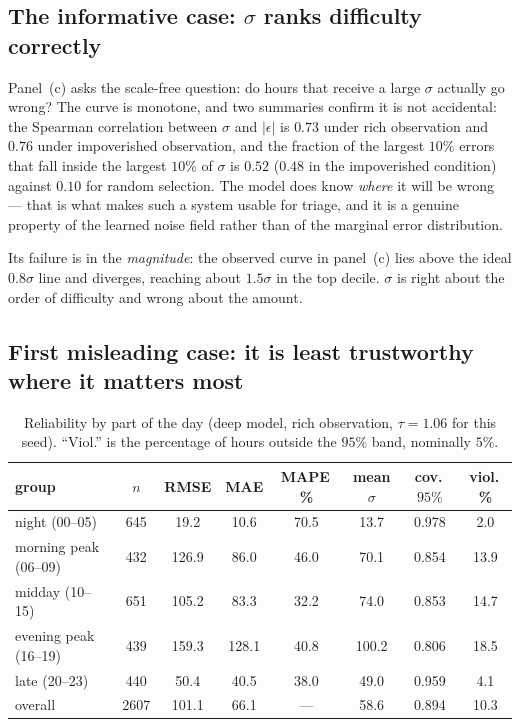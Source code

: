 \documentclass[11pt,a4paper]{article}
\begin{document}
\subsection{The informative case: $\sigma$ ranks difficulty correctly}

Panel~(c) asks the scale-free question: do hours that receive a large $\sigma$ actually go wrong? The
curve is monotone, and two summaries confirm it is not accidental: the Spearman correlation between
$\sigma$ and $|\epsilon|$ is $0.73$ under rich observation and $0.76$ under impoverished observation,
and the fraction of the largest $10\%$ errors that fall inside the largest $10\%$ of $\sigma$ is
$0.52$ ($0.48$ in the impoverished condition) against $0.10$ for random selection. The model does know
\emph{where} it will be wrong --- that is what makes such a system usable for triage, and it is a
genuine property of the learned noise field rather than of the marginal error distribution.

Its failure is in the \emph{magnitude}: the observed curve in panel~(c) lies above the ideal
$0.8\sigma$ line and diverges, reaching about $1.5\sigma$ in the top decile. $\sigma$ is right about
the order of difficulty and wrong about the amount.

\subsection{First misleading case: it is least trustworthy where it matters most}

\begin{table}[t]
\centering
\caption{Reliability by part of the day (deep model, rich observation, $\tau=1.06$ for this seed).
``Viol.'' is the percentage of hours outside the $95\%$ band, nominally $5\%$.}
\label{tab:groups}
\small
\begin{tabular}{lccccccc}
\toprule
group & $n$ & RMSE & MAE & MAPE\,\% & mean $\sigma$ & cov.\,$95\%$ & viol.\,\% \\
\midrule
night (00--05)        & 645 & 19.2  & 10.6  & 70.5 & 13.7  & 0.978 & 2.0 \\
morning peak (06--09) & 432 & 126.9 & 86.0  & 46.0 & 70.1  & 0.854 & 13.9 \\
midday (10--15)       & 651 & 105.2 & 83.3  & 32.2 & 74.0  & 0.853 & 14.7 \\
evening peak (16--19) & 439 & 159.3 & 128.1 & 40.8 & 100.2 & 0.806 & 18.5 \\
late (20--23)         & 440 & 50.4  & 40.5  & 38.0 & 49.0  & 0.959 & 4.1 \\
\midrule
overall               & \num{2607} & 101.1 & 66.1 & --- & 58.6 & 0.894 & 10.3 \\
\bottomrule
\end{tabular}
\end{table}
\end{document}
